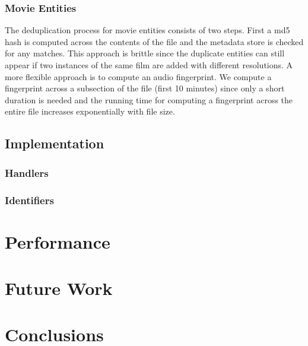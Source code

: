 \documentclass[paper=a4, fontsize=11pt]{scrartcl} %
\numberwithin{equation}{section} %
\numberwithin{figure}{section} %
\numberwithin{table}{section} %
\begin{document}
\subsubsection{Movie Entities}
\label{sec:dedup-movie-entities}
The deduplication process for movie entities consists of two steps. First a md5 hash is computed across the contents of the file and the metadata store is checked for any matches. This approach is brittle since the duplicate entities can still appear if two instances of the same film are added with different resolutions. A more flexible approach is to compute an audio fingerprint. We compute a fingerprint across a subsection of the file (first 10 minutes) since only a short duration is needed and the running time for computing a fingerprint across the entire file increases exponentially with file size. 




\subsection{Implementation}
\label{sec:implementation}

\subsubsection{Handlers}
\label{sec:handlers}

\subsubsection{Identifiers}
\label{sec:identifiers}


\section{Performance}
\label{sec:performance}


\section{Future Work}
\label{sec:future-work}

\section{Conclusions}
\label{sec:conclusions}

\end{document}
